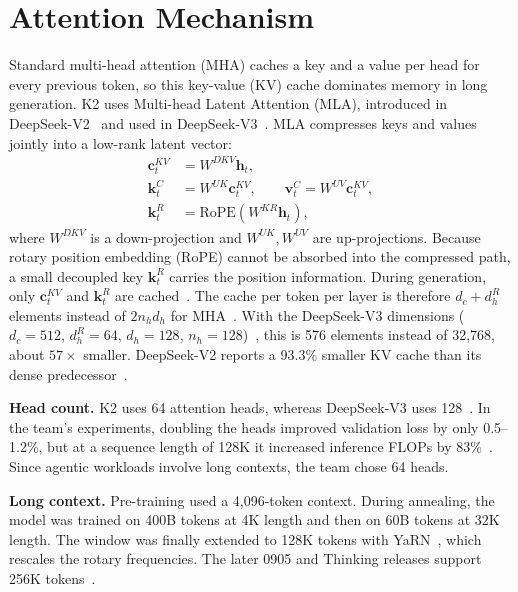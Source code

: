 \documentclass[conference]{IEEEtran}
\begin{document}
\section{Attention Mechanism}
Standard multi-head attention (MHA) caches a key and a value per head for every previous token, so this key-value (KV) cache dominates memory in long generation. K2 uses Multi-head Latent Attention (MLA), introduced in DeepSeek-V2~\cite{deepseekv2} and used in DeepSeek-V3~\cite{deepseekv3,kimik2}. MLA compresses keys and values jointly into a low-rank latent vector:
\begin{align}
\mathbf{c}^{KV}_t&=W^{DKV}\mathbf{h}_t,\\
\mathbf{k}^{C}_t&=W^{UK}\mathbf{c}^{KV}_t,\qquad \mathbf{v}^{C}_t=W^{UV}\mathbf{c}^{KV}_t,\\
\mathbf{k}^{R}_t&=\mathrm{RoPE}\!\left(W^{KR}\mathbf{h}_t\right),
\end{align}
where $W^{DKV}$ is a down-projection and $W^{UK},W^{UV}$ are up-projections. Because rotary position embedding (RoPE) cannot be absorbed into the compressed path, a small decoupled key $\mathbf{k}^{R}_t$ carries the position information. During generation, only $\mathbf{c}^{KV}_t$ and $\mathbf{k}^{R}_t$ are cached~\cite{deepseekv3}. The cache per token per layer is therefore $d_c+d_h^R$ elements instead of $2n_hd_h$ for MHA~\cite{deepseekv2}. With the DeepSeek-V3 dimensions ($d_c=512$, $d_h^R=64$, $d_h=128$, $n_h=128$)~\cite{deepseekv3}, this is 576 elements instead of 32{,}768, about $57\times$ smaller. DeepSeek-V2 reports a 93.3\% smaller KV cache than its dense predecessor~\cite{deepseekv2}.

\textbf{Head count.} K2 uses 64 attention heads, whereas DeepSeek-V3 uses 128~\cite{kimik2}. In the team's experiments, doubling the heads improved validation loss by only 0.5--1.2\%, but at a sequence length of 128K it increased inference FLOPs by 83\%~\cite{kimik2}. Since agentic workloads involve long contexts, the team chose 64 heads.

\textbf{Long context.} Pre-training used a 4,096-token context. During annealing, the model was trained on 400B tokens at 4K length and then on 60B tokens at 32K length. The window was finally extended to 128K tokens with YaRN~\cite{kimik2,yarn}, which rescales the rotary frequencies. The later 0905 and Thinking releases support 256K tokens~\cite{kimik2thinking}.
\end{document}
